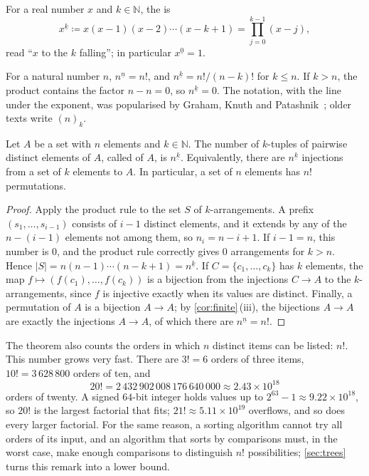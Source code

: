 \begin{definition}
\label{def:falling-factorial}
For a real number $x$ and $k\in\mathbb N$, the  is
\[
x^{\underline k}\coloneqq x(x-1)(x-2)\cdots(x-k+1)=\prod_{j=0}^{k-1}(x-j),
\]
read ``$x$ to the $k$ falling''; in particular $x^{\underline 0}=1$.
\end{definition}

For a natural number $n$, $n^{\underline n}=n!$, and $n^{\underline k}=n!/(n-k)!$ for $k\le n$. If $k>n$, the product contains the factor $n-n=0$, so $n^{\underline k}=0$. The notation, with the line under the exponent, was popularised by Graham, Knuth and Patashnik~\cite[Sect.~2.6]{graham1994concrete}; older texts write $(n)_k$.

\begin{theorem}[Arrangements]
\label{thm:arrangements}
Let $A$ be a set with $n$ elements and $k\in\mathbb N$. The number of $k$-tuples of pairwise distinct elements of $A$, called  of $A$, is $n^{\underline k}$. Equivalently, there are $n^{\underline k}$ injections from a set of $k$ elements to $A$. In particular, a set of $n$ elements has $n!$ permutations.
\end{theorem}

\begin{proof}
Apply the product rule to the set $S$ of $k$-arrangements. A prefix $(s_1,\ldots,s_{i-1})$ consists of $i-1$ distinct elements, and it extends by any of the $n-(i-1)$ elements not among them, so $n_i=n-i+1$. If $i-1=n$, this number is $0$, and the product rule correctly gives $0$ arrangements for $k>n$. Hence $|S|=n(n-1)\cdots(n-k+1)=n^{\underline k}$. If $C=\{c_1,\ldots,c_k\}$ has $k$ elements, the map $f\mapsto(f(c_1),\ldots,f(c_k))$ is a bijection from the injections $C\to A$ to the $k$-arrangements, since $f$ is injective exactly when its values are distinct. Finally, a permutation of $A$ is a bijection $A\to A$; by \cref{cor:finite}\,(iii), the bijections $A\to A$ are exactly the injections $A\to A$, of which there are $n^{\underline n}=n!$.
\end{proof}

The theorem also counts the orders in which $n$ distinct items can be listed: $n!$. This number grows very fast. There are $3!=6$ orders of three items, $10!=3\,628\,800$ orders of ten, and
\[
20!=2\,432\,902\,008\,176\,640\,000\approx2.43\times10^{18}
\]
orders of twenty. A signed $64$-bit integer holds values up to $2^{63}-1\approx9.22\times10^{18}$, so $20!$ is the largest factorial that fits; $21!\approx5.11\times10^{19}$ overflows, and so does every larger factorial. For the same reason, a sorting algorithm cannot try all orders of its input, and an algorithm that sorts by comparisons must, in the worst case, make enough comparisons to distinguish $n!$ possibilities; \cref{sec:trees} turns this remark into a lower bound.

